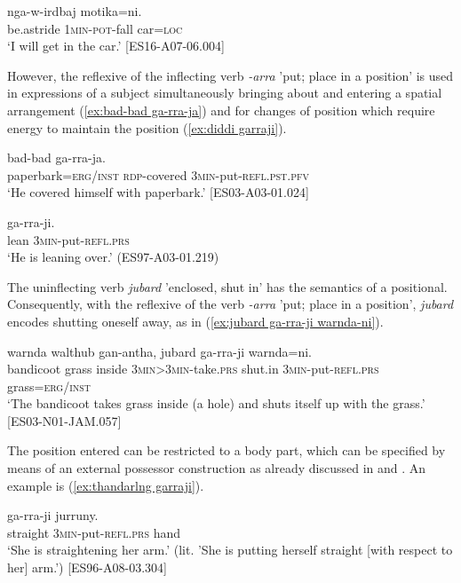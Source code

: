 \documentclass[output=paper,colorlinks,citecolor=brown]{langscibook}
\begin{document}
\ea
{} {nga-w-irdbaj} {motika=ni.} \\
be.astride \textsc{1min-pot}-fall car=\textsc{loc} \\
\glt `I will get in the car.’ [ES16-A07-06.004]
\label{ex:ngamang ngawirdbaj}
\z

However, the reflexive of the inflecting verb \textit{-arra} 'put; place in a position' is used in expressions of a subject simultaneously bringing about and entering a spatial arrangement (\ref{ex:bad-bad ga-rra-ja}) and for changes of position which require energy to maintain the position (\ref{ex:diddi garraji}).

\ea
{} {bad-bad} {ga-rra-ja.} \\
paperbark=\textsc{erg/inst} \textsc{rdp}-covered \textsc{3min}-put-\textsc{refl.pst.pfv} \\
\glt `He covered himself with paperbark.’ [ES03-A03-01.024]
\label{ex:bad-bad ga-rra-ja}
\z

\ea
{} {ga-rra-ji}. \\
lean \textsc{3min}-put-\textsc{refl.prs} \\
\glt `He is leaning over.' (ES97-A03-01.219)
\label{ex:diddi garraji}
\z

The uninflecting verb \textit{jubard} 'enclosed, shut in' has the semantics of a positional. Consequently, with the reflexive of the verb \textit{-arra} 'put; place in a position', \textit{jubard} encodes shutting oneself away, as in (\ref{ex:jubard ga-rra-ji warnda-ni}).

\ea
{} {warnda} {walthub} {gan-antha}, {jubard} {ga-rra-ji} {warnda=ni}. \\
bandicoot grass inside \textsc{3min>3min}-take.\textsc{prs}  shut.in \textsc{3min}-put-\textsc{refl.prs} grass=\textsc{erg/inst} \\
\glt `The bandicoot takes grass inside (a hole) and shuts itself up with the grass.' [ES03-N01-JAM.057]
\label{ex:jubard ga-rra-ji warnda-ni}
\z

The position entered can be restricted to a body part, which can be specified by means of an external possessor construction as already discussed in  and . An example is (\ref{ex:thandarlng garraji}).

\ea
{} {ga-rra-ji} {jurruny}. \\
straight \textsc{3min}-put-\textsc{refl.prs} hand \\
\glt `She is straightening her arm.' (lit. 'She is putting herself straight [with respect to her] arm.') [ES96-A08-03.304]
\label{ex:thandarlng garraji}
\z
\end{document}
